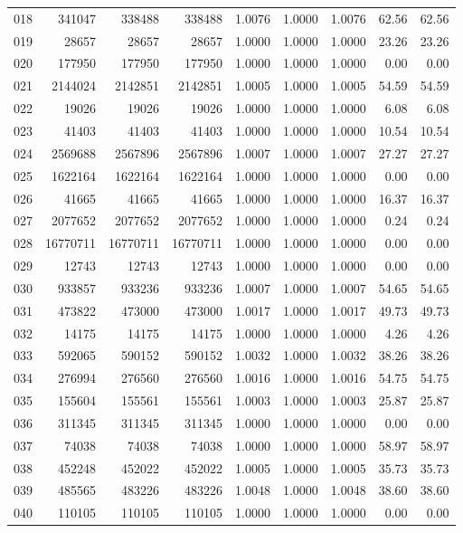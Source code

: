 \begin{longtable}{crrrrrrrr}
018 & 341047 & 338488 & 338488 & 1.0076 & 1.0000 & 1.0076 & 62.56 & 62.56 \\
019 & 28657 & 28657 & 28657 & 1.0000 & 1.0000 & 1.0000 & 23.26 & 23.26 \\
020 & 177950 & 177950 & 177950 & 1.0000 & 1.0000 & 1.0000 & 0.00 & 0.00 \\
021 & 2144024 & 2142851 & 2142851 & 1.0005 & 1.0000 & 1.0005 & 54.59 & 54.59 \\
022 & 19026 & 19026 & 19026 & 1.0000 & 1.0000 & 1.0000 & 6.08 & 6.08 \\
023 & 41403 & 41403 & 41403 & 1.0000 & 1.0000 & 1.0000 & 10.54 & 10.54 \\
024 & 2569688 & 2567896 & 2567896 & 1.0007 & 1.0000 & 1.0007 & 27.27 & 27.27 \\
025 & 1622164 & 1622164 & 1622164 & 1.0000 & 1.0000 & 1.0000 & 0.00 & 0.00 \\
026 & 41665 & 41665 & 41665 & 1.0000 & 1.0000 & 1.0000 & 16.37 & 16.37 \\
027 & 2077652 & 2077652 & 2077652 & 1.0000 & 1.0000 & 1.0000 & 0.24 & 0.24 \\
028 & 16770711 & 16770711 & 16770711 & 1.0000 & 1.0000 & 1.0000 & 0.00 & 0.00 \\
029 & 12743 & 12743 & 12743 & 1.0000 & 1.0000 & 1.0000 & 0.00 & 0.00 \\
030 & 933857 & 933236 & 933236 & 1.0007 & 1.0000 & 1.0007 & 54.65 & 54.65 \\
031 & 473822 & 473000 & 473000 & 1.0017 & 1.0000 & 1.0017 & 49.73 & 49.73 \\
032 & 14175 & 14175 & 14175 & 1.0000 & 1.0000 & 1.0000 & 4.26 & 4.26 \\
033 & 592065 & 590152 & 590152 & 1.0032 & 1.0000 & 1.0032 & 38.26 & 38.26 \\
034 & 276994 & 276560 & 276560 & 1.0016 & 1.0000 & 1.0016 & 54.75 & 54.75 \\
035 & 155604 & 155561 & 155561 & 1.0003 & 1.0000 & 1.0003 & 25.87 & 25.87 \\
036 & 311345 & 311345 & 311345 & 1.0000 & 1.0000 & 1.0000 & 0.00 & 0.00 \\
037 & 74038 & 74038 & 74038 & 1.0000 & 1.0000 & 1.0000 & 58.97 & 58.97 \\
038 & 452248 & 452022 & 452022 & 1.0005 & 1.0000 & 1.0005 & 35.73 & 35.73 \\
039 & 485565 & 483226 & 483226 & 1.0048 & 1.0000 & 1.0048 & 38.60 & 38.60 \\
040 & 110105 & 110105 & 110105 & 1.0000 & 1.0000 & 1.0000 & 0.00 & 0.00 \\

\end{longtable}
